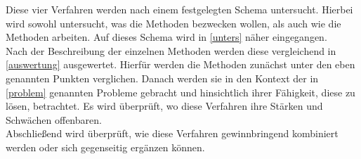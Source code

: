 Diese vier Verfahren werden nach einem festgelegten Schema untersucht. Hierbei wird sowohl untersucht, was die Methoden bezwecken wollen, als auch wie die Methoden arbeiten. Auf dieses Schema wird in \ref{unters} n\"aher eingegangen. \\

Nach der Beschreibung der einzelnen Methoden werden diese vergleichend in \ref{auswertung} ausgewertet. Hierf\"ur werden die Methoden zun\"achst unter den eben genannten Punkten verglichen. Danach werden sie in den Kontext der in \ref{problem} genannten Probleme gebracht und hinsichtlich ihrer F\"ahigkeit, diese zu l\"osen, betrachtet. Es wird \"uberpr\"uft, wo diese Verfahren ihre St\"arken und Schw\"achen offenbaren. \\

Abschlie\ss{}end wird \"uberpr\"uft, wie diese Verfahren gewinnbringend kombiniert werden oder sich gegenseitig erg\"anzen k\"onnen. \\

